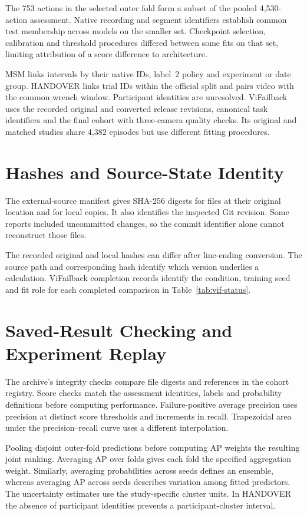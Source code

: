 The 753 actions in the selected outer fold form a subset of the pooled 4,530-action
assessment. Native recording and segment identifiers establish common test membership
across models on the smaller set. Checkpoint selection, calibration and threshold
procedures differed between some fits on that set, limiting attribution of a score
difference to architecture.

MSM links intervals by their native IDs, label~2 policy and experiment or date group.
HANDOVER links trial IDs within the official split and pairs video with the common
wrench window. Participant identities are unresolved. ViFailback uses the recorded
original and converted release revisions, canonical task identifiers and the final
cohort with three-camera quality checks. Its original and matched studies share 4,382
episodes but use different fitting procedures.

\section{Hashes and Source-State Identity}
The external-source manifest gives SHA-256 digests for files at their original location
and for local copies. It also identifies the inspected Git revision. Some reports
included uncommitted changes, so the commit identifier alone cannot reconstruct those
files.

The recorded original and local hashes can differ after line-ending conversion. The
source path and corresponding hash identify which version underlies a calculation.
ViFailback completion records identify the condition, training seed and fit role for
each completed comparison in Table~\ref{tab:vif-status}.

\section{Saved-Result Checking and Experiment Replay}
The archive's integrity checks compare file digests and references in the cohort
registry. Score checks match the assessment identities, labels and probability
definitions before computing performance. Failure-positive average precision uses
precision at distinct score thresholds and increments in recall. Trapezoidal area under
the precision--recall curve uses a different interpolation.

Pooling disjoint outer-fold predictions before computing AP weights the resulting joint
ranking. Averaging AP over folds gives each fold the specified aggregation weight.
Similarly, averaging probabilities across seeds defines an ensemble, whereas averaging
AP across seeds describes variation among fitted predictors. The uncertainty estimates
use the study-specific cluster units. In HANDOVER the absence of participant identities
prevents a participant-cluster interval.

